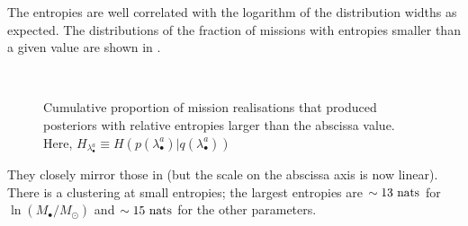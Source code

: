 The entropies are well correlated with the logarithm of the distribution widths as expected. The distributions of the fraction of missions with entropies smaller than a given value are shown in .
\begin{figure}%
\centering
    \quad 
    \\
    \quad
\caption{Cumulative proportion of mission realisations that produced posteriors with relative entropies larger than the abscissa value. Here, $H_{\lambda_\bullet^a} \equiv H(p(\lambda_\bullet^a)|q(\lambda_\bullet^a))$}\label{fig:H-ent}
\end{figure}
They closely mirror those in  (but the scale on the abscissa axis is now linear). There is a clustering at small entropies; the largest entropies are $\sim 13~\mathrm{nats}$ for $\ln(M_\bullet/M_\odot)$ and $\sim 15~\mathrm{nats}$ for the other parameters.

